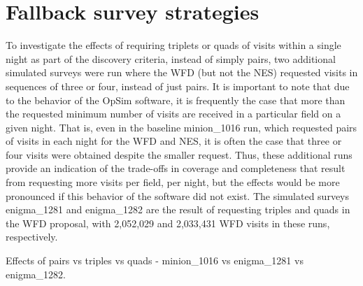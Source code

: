 \section{Fallback survey strategies}\label{sec:AppFallback}

To investigate the effects of requiring triplets or quads of visits within a single night as part of the discovery criteria, instead of simply pairs, two additional simulated surveys were run where the WFD (but not the NES) requested visits in sequences of three or four, instead of just pairs. It is important to note that due to the behavior of the OpSim software, it is frequently the case that more than the requested minimum number of visits are received in a particular field on a given night. That is, even in the baseline minion\_1016 run, which requested pairs of visits in each night for the WFD and NES, it is often the case that three or four visits were obtained despite the smaller request. Thus, these additional runs provide an indication of the trade-offs in coverage and completeness that result from requesting more visits per field, per night, but the effects would be more pronounced if this behavior of the software did not exist. The simulated surveys enigma\_1281 and enigma\_1282 are the result of requesting triples and quads in the WFD proposal, with 2,052,029 and 2,033,431 WFD visits in these runs, respectively. 



Effects of pairs vs triples vs quads - minion\_1016 vs enigma\_1281 vs enigma\_1282.

